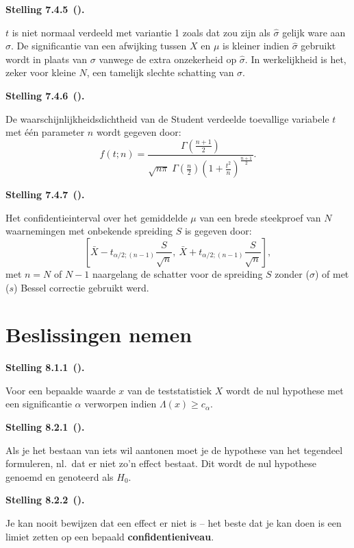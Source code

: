 \documentclass[10pt,a4paper]{article}
\newenvironment{res}[3][]{%
  \begin{tcolorbox}[
    breakable,          %
    colback=gray!10,    %
    colframe=gray!40,   %
    boxrule=0.5pt,      %
    left=6pt, right=6pt, top=6pt, bottom=6pt %
  ]
  \noindent\textbf{#2 #3}\if\relax\detokenize{#1}\relax\else\ \textbf{(#1)}\fi\textbf{.}~\ignorespaces
}{%
  \end{tcolorbox}
}
\begin{document}
\begin{res}{Stelling}{7.4.5}
$t$ is niet normaal verdeeld met variantie 1 zoals dat zou zijn als $\hat\sigma$ gelijk ware aan $\sigma$. De significantie van een afwijking tussen $X$ en $\mu$ is kleiner indien $\hat\sigma$ gebruikt wordt in plaats van $\sigma$ vanwege de extra onzekerheid op $\hat\sigma$. In werkelijkheid is het, zeker voor kleine $N$, een tamelijk slechte schatting van $\sigma$.
\end{res}

\begin{res}{Stelling}{7.4.6}
De waarschijnlijkheidsdichtheid van de Student verdeelde toevallige variabele $t$ met \'e\'en parameter $n$ wordt gegeven door:
\[
f(t;n) = \frac{\Gamma\!\left(\frac{n+1}{2}\right)}{\sqrt{n\pi}\;\Gamma\!\left(\frac{n}{2}\right)\left(1+\frac{t^2}{n}\right)^{\frac{n+1}{2}}}.
\]
\end{res}

\begin{res}{Stelling}{7.4.7}
Het confidentieinterval over het gemiddelde $\mu$ van een brede steekproef van $N$ waarnemingen met onbekende spreiding $S$ is gegeven door:
\[
\left[\bar X - t_{\alpha/2;(n-1)}\frac{S}{\sqrt n},\ \bar X + t_{\alpha/2;(n-1)}\frac{S}{\sqrt n}\right],
\]
met $n=N$ of $N-1$ naargelang de schatter voor de spreiding $S$ zonder ($\sigma$) of met ($s$) Bessel correctie gebruikt werd.
\end{res}

\section{Beslissingen nemen}

\begin{res}{Stelling}{8.1.1}
Voor een bepaalde waarde $x$ van de teststatistiek $X$ wordt de nul hypothese met een significantie $\alpha$ verworpen indien $\Lambda(x) \ge c_\alpha$.
\end{res}

\begin{res}{Stelling}{8.2.1}
Als je het bestaan van iets wil aantonen moet je de hypothese van het tegendeel formuleren, nl.\ dat er niet zo'n effect bestaat. Dit wordt de nul hypothese genoemd en genoteerd als $H_0$.
\end{res}

\begin{res}{Stelling}{8.2.2}
Je kan nooit bewijzen dat een effect er niet is -- het beste dat je kan doen is een limiet zetten op een bepaald \textbf{confidentieniveau}.
\end{res}
\end{document}
